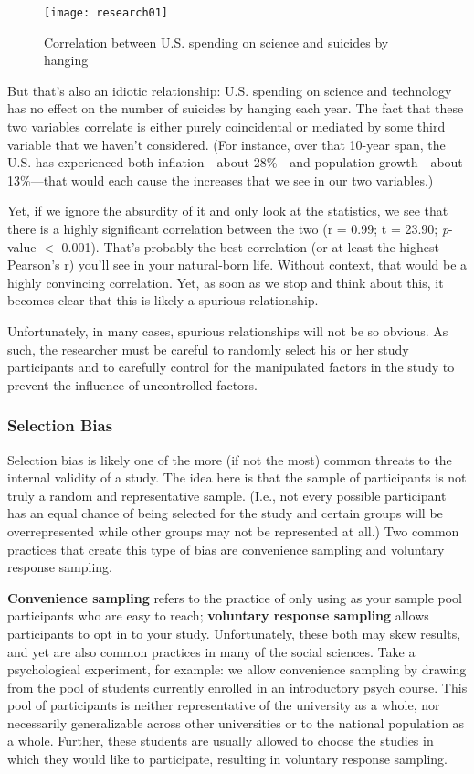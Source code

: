 \begin{figure}[htp]
\texttt{[image: research01]}
\caption{Correlation between U.S. spending on science and suicides by hanging}
\label{fig:research02}
\end{figure}

But that's also an idiotic relationship: U.S. spending on science and technology has no effect on the number of suicides by hanging each year. The fact that these two variables correlate is either purely coincidental or mediated by some third variable that we haven't considered. (For instance, over that 10-year span, the U.S. has experienced both inflation---about 28\%---and population growth---about 13\%---that would each cause the increases that we see in our two variables.)

Yet, if we ignore the absurdity of it and only look at the statistics, we see that there is a highly significant correlation between the two (r = 0.99; t = 23.90; \textit{p}-value $<$ 0.001). That's probably the best correlation (or at least the highest Pearson's r) you'll see in your natural-born life. Without context, that would be a highly convincing correlation. Yet, as soon as we stop and think about this, it becomes clear that this is likely a spurious relationship.

Unfortunately, in many cases, spurious relationships will not be so obvious. As such, the researcher must be careful to randomly select his or her study participants and to carefully control for the manipulated factors in the study to prevent the influence of uncontrolled factors.

\subsubsection{Selection Bias} 
Selection bias is likely one of the more (if not the most) common threats to the internal validity of a study. The idea here is that the sample of participants is not truly a random and representative sample. (I.e., not every possible participant has an equal chance of being selected for the study and certain groups will be overrepresented while other groups may not be represented at all.) Two common practices that create this type of bias are convenience sampling and voluntary response sampling.

\textbf{Convenience sampling} refers to the practice of only using as your sample pool participants who are easy to reach; \textbf{voluntary response sampling} allows participants to opt in to your study. Unfortunately, these both may skew results, and yet are also common practices in many of the social sciences. Take a psychological experiment, for example: we allow convenience sampling by drawing from the pool of students currently enrolled in an introductory psych course. This pool of participants is neither representative of the university as a whole, nor necessarily generalizable across other universities or to the national population as a whole. Further, these students are usually allowed to choose the studies in which they would like to participate, resulting in voluntary response sampling.

